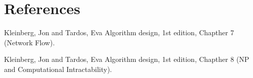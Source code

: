 \documentclass{tufte-handout}
\begin{document}
\section{References}
\begin{description}
  [1] Kleinberg, Jon and Tardos, Eva
  Algorithm design, 1st edition, Chapther 7 (Network Flow).
\end{description}

\begin{description}
  [2] Kleinberg, Jon and Tardos, Eva
  Algorithm design, 1st edition, Chapther 8 (NP and Computational Intractability).
\end{description}
\end{document}
